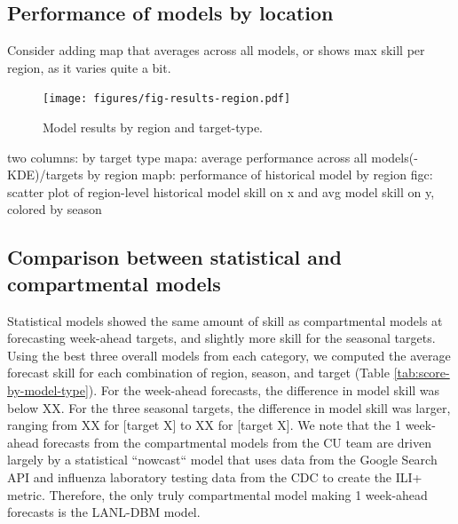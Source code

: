 \documentclass{article}\usepackage[]{graphicx}\usepackage[]{color}
\begin{document}
\subsection{Performance of models by location}

Consider adding map that averages across all models, or shows max skill per region, as it varies quite a bit.

\begin{figure}[htbp]
\begin{center}
\texttt{[image: figures/fig-results-region.pdf]}
\caption{Model results by region and target-type.}
\label{fig:results-region}
\end{center}
\end{figure}


two columns: by target type
mapa: average performance across all models(-KDE)/targets by region
mapb: performance of historical model by region
figc: scatter plot of region-level historical model skill on x and avg model skill on y, colored by season


\subsection{Comparison between statistical and compartmental models}


Statistical models showed the same amount of skill as compartmental models at forecasting week-ahead targets, and slightly more skill for the seasonal targets. 
Using the best three overall models from each category, we computed the average forecast skill for each combination of region, season, and target (Table \ref{tab:score-by-model-type}). 
For the week-ahead forecasts, the difference in model skill was below XX.
For the three seasonal targets, the difference in model skill was larger, ranging from XX for [target X] to XX for [target X].
We note that the 1 week-ahead forecasts from the compartmental models from the CU team are driven largely by a statistical ``nowcast`` model that uses data from the Google Search API and influenza laboratory testing data from the CDC to create the ILI+ metric.\cite{yang2014}
Therefore, the only truly compartmental model making 1 week-ahead forecasts is the LANL-DBM model. 




% 
\end{document}
